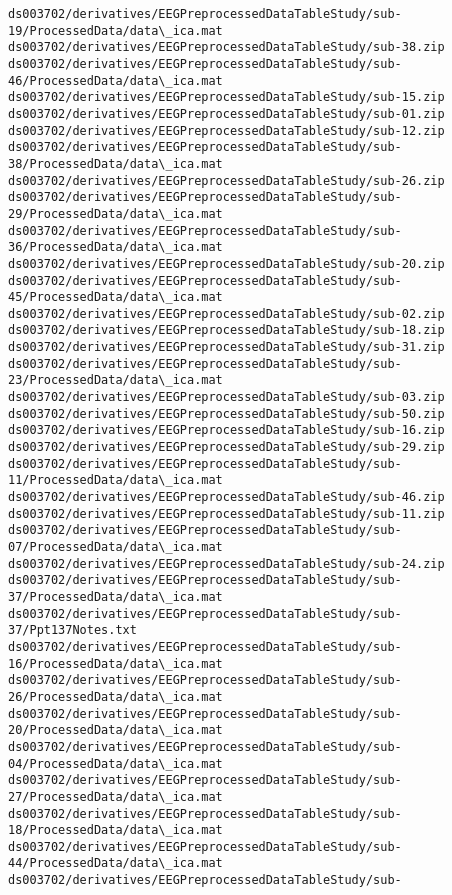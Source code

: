 \documentclass[11pt]{article}
\begin{document}
\begin{Verbatim}[commandchars=\\\{\}]
ds003702/derivatives/EEGPreprocessedDataTableStudy/sub-
19/ProcessedData/data\_ica.mat
ds003702/derivatives/EEGPreprocessedDataTableStudy/sub-38.zip
ds003702/derivatives/EEGPreprocessedDataTableStudy/sub-
46/ProcessedData/data\_ica.mat
ds003702/derivatives/EEGPreprocessedDataTableStudy/sub-15.zip
ds003702/derivatives/EEGPreprocessedDataTableStudy/sub-01.zip
ds003702/derivatives/EEGPreprocessedDataTableStudy/sub-12.zip
ds003702/derivatives/EEGPreprocessedDataTableStudy/sub-
38/ProcessedData/data\_ica.mat
ds003702/derivatives/EEGPreprocessedDataTableStudy/sub-26.zip
ds003702/derivatives/EEGPreprocessedDataTableStudy/sub-
29/ProcessedData/data\_ica.mat
ds003702/derivatives/EEGPreprocessedDataTableStudy/sub-
36/ProcessedData/data\_ica.mat
ds003702/derivatives/EEGPreprocessedDataTableStudy/sub-20.zip
ds003702/derivatives/EEGPreprocessedDataTableStudy/sub-
45/ProcessedData/data\_ica.mat
ds003702/derivatives/EEGPreprocessedDataTableStudy/sub-02.zip
ds003702/derivatives/EEGPreprocessedDataTableStudy/sub-18.zip
ds003702/derivatives/EEGPreprocessedDataTableStudy/sub-31.zip
ds003702/derivatives/EEGPreprocessedDataTableStudy/sub-
23/ProcessedData/data\_ica.mat
ds003702/derivatives/EEGPreprocessedDataTableStudy/sub-03.zip
ds003702/derivatives/EEGPreprocessedDataTableStudy/sub-50.zip
ds003702/derivatives/EEGPreprocessedDataTableStudy/sub-16.zip
ds003702/derivatives/EEGPreprocessedDataTableStudy/sub-29.zip
ds003702/derivatives/EEGPreprocessedDataTableStudy/sub-
11/ProcessedData/data\_ica.mat
ds003702/derivatives/EEGPreprocessedDataTableStudy/sub-46.zip
ds003702/derivatives/EEGPreprocessedDataTableStudy/sub-11.zip
ds003702/derivatives/EEGPreprocessedDataTableStudy/sub-
07/ProcessedData/data\_ica.mat
ds003702/derivatives/EEGPreprocessedDataTableStudy/sub-24.zip
ds003702/derivatives/EEGPreprocessedDataTableStudy/sub-
37/ProcessedData/data\_ica.mat
ds003702/derivatives/EEGPreprocessedDataTableStudy/sub-
37/Ppt137Notes.txt
ds003702/derivatives/EEGPreprocessedDataTableStudy/sub-
16/ProcessedData/data\_ica.mat
ds003702/derivatives/EEGPreprocessedDataTableStudy/sub-
26/ProcessedData/data\_ica.mat
ds003702/derivatives/EEGPreprocessedDataTableStudy/sub-
20/ProcessedData/data\_ica.mat
ds003702/derivatives/EEGPreprocessedDataTableStudy/sub-
04/ProcessedData/data\_ica.mat
ds003702/derivatives/EEGPreprocessedDataTableStudy/sub-
27/ProcessedData/data\_ica.mat
ds003702/derivatives/EEGPreprocessedDataTableStudy/sub-
18/ProcessedData/data\_ica.mat
ds003702/derivatives/EEGPreprocessedDataTableStudy/sub-
44/ProcessedData/data\_ica.mat
ds003702/derivatives/EEGPreprocessedDataTableStudy/sub-

\end{Verbatim}
\end{document}
